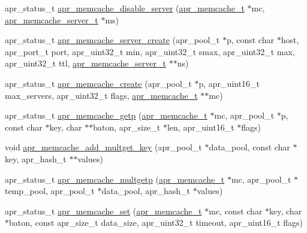\begin{DoxyCompactItemize}
\item 
apr\-\_\-status\-\_\-t \hyperlink{group___a_p_r___util___m_c_gae8a982e8794a08a78264ec3a966797fc}{apr\-\_\-memcache\-\_\-disable\-\_\-server} (\hyperlink{structapr__memcache__t}{apr\-\_\-memcache\-\_\-t} $\ast$mc, \hyperlink{structapr__memcache__server__t}{apr\-\_\-memcache\-\_\-server\-\_\-t} $\ast$ms)
\item 
apr\-\_\-status\-\_\-t \hyperlink{group___a_p_r___util___m_c_ga18ddd72bc1ab5edb0a08a8f26f193bd3}{apr\-\_\-memcache\-\_\-server\-\_\-create} (apr\-\_\-pool\-\_\-t $\ast$p, const char $\ast$host, apr\-\_\-port\-\_\-t port, apr\-\_\-uint32\-\_\-t min, apr\-\_\-uint32\-\_\-t smax, apr\-\_\-uint32\-\_\-t max, apr\-\_\-uint32\-\_\-t ttl, \hyperlink{structapr__memcache__server__t}{apr\-\_\-memcache\-\_\-server\-\_\-t} $\ast$$\ast$ns)
\item 
apr\-\_\-status\-\_\-t \hyperlink{group___a_p_r___util___m_c_ga5a510d8ac3f5bf12cf2da1a445f4854b}{apr\-\_\-memcache\-\_\-create} (apr\-\_\-pool\-\_\-t $\ast$p, apr\-\_\-uint16\-\_\-t max\-\_\-servers, apr\-\_\-uint32\-\_\-t flags, \hyperlink{structapr__memcache__t}{apr\-\_\-memcache\-\_\-t} $\ast$$\ast$mc)
\item 
apr\-\_\-status\-\_\-t \hyperlink{group___a_p_r___util___m_c_gac41597ff979e7a181da459398196196f}{apr\-\_\-memcache\-\_\-getp} (\hyperlink{structapr__memcache__t}{apr\-\_\-memcache\-\_\-t} $\ast$mc, apr\-\_\-pool\-\_\-t $\ast$p, const char $\ast$key, char $\ast$$\ast$baton, apr\-\_\-size\-\_\-t $\ast$len, apr\-\_\-uint16\-\_\-t $\ast$flags)
\item 
void \hyperlink{group___a_p_r___util___m_c_gac94d47eedb9baebe823b2e5eeed54157}{apr\-\_\-memcache\-\_\-add\-\_\-multget\-\_\-key} (apr\-\_\-pool\-\_\-t $\ast$data\-\_\-pool, const char $\ast$key, apr\-\_\-hash\-\_\-t $\ast$$\ast$values)
\item 
apr\-\_\-status\-\_\-t \hyperlink{group___a_p_r___util___m_c_ga4a5beadb98954331896e95c35324b0fc}{apr\-\_\-memcache\-\_\-multgetp} (\hyperlink{structapr__memcache__t}{apr\-\_\-memcache\-\_\-t} $\ast$mc, apr\-\_\-pool\-\_\-t $\ast$temp\-\_\-pool, apr\-\_\-pool\-\_\-t $\ast$data\-\_\-pool, apr\-\_\-hash\-\_\-t $\ast$values)
\item 
apr\-\_\-status\-\_\-t \hyperlink{group___a_p_r___util___m_c_gaa5bbe2c60302a689773d6a70da8f99fb}{apr\-\_\-memcache\-\_\-set} (\hyperlink{structapr__memcache__t}{apr\-\_\-memcache\-\_\-t} $\ast$mc, const char $\ast$key, char $\ast$baton, const apr\-\_\-size\-\_\-t data\-\_\-size, apr\-\_\-uint32\-\_\-t timeout, apr\-\_\-uint16\-\_\-t flags)

\end{DoxyCompactItemize}
